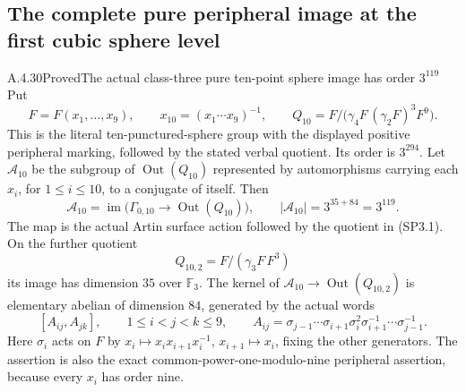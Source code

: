 \subsection{The complete pure peripheral image at the first cubic sphere level}

\begin{result}{A.4.30}{Proved}{The actual class-three pure ten-point sphere image has order $3^{119}$}
Put
\[
 F=F(x_1,\ldots,x_9),\qquad
 x_{10}=(x_1\cdots x_9)^{-1},\qquad
 Q_{10}=F/\bigl(\gamma_4F\,(\gamma_2F)^3F^9\bigr).
                                                               \tag{SP3.1}
\]
This is the literal ten-punctured-sphere group with the displayed
positive peripheral marking, followed by the stated verbal quotient.
Its order is $3^{294}$.  Let $\mathcal A_{10}$ be the subgroup of
$\operatorname{Out}(Q_{10})$ represented by automorphisms carrying
each $x_i$, for $1\leq i\leq10$, to a conjugate of itself.  Then
\[
 \mathcal A_{10}
   =\operatorname{im}\bigl(\Gamma_{0,10}
                       \longrightarrow\operatorname{Out}(Q_{10})\bigr),
 \qquad |\mathcal A_{10}|=3^{35+84}=3^{119}.             \tag{SP3.2}
\]
The map is the actual Artin surface action followed by the quotient
in (SP3.1).  On the further quotient
\[
 Q_{10,2}=F/(\gamma_3F\,F^3)
                                                               \tag{SP3.3}
\]
its image has dimension $35$ over $\mathbb F_3$.  The kernel of
$\mathcal A_{10}\to\operatorname{Out}(Q_{10,2})$ is elementary
abelian of dimension $84$, generated by the actual words
\[
 [A_{ij},A_{jk}],\qquad 1\leq i<j<k\leq9,\qquad
 A_{ij}=\sigma_{j-1}\cdots\sigma_{i+1}\sigma_i^2
                    \sigma_{i+1}^{-1}\cdots\sigma_{j-1}^{-1}.
                                                               \tag{SP3.4}
\]
Here $\sigma_i$ acts on $F$ by
$x_i\mapsto x_ix_{i+1}x_i^{-1}$,
$x_{i+1}\mapsto x_i$, fixing the other generators.
The assertion is also the exact common-power-one-modulo-nine
peripheral assertion, because every $x_i$ has order nine.
\end{result}

